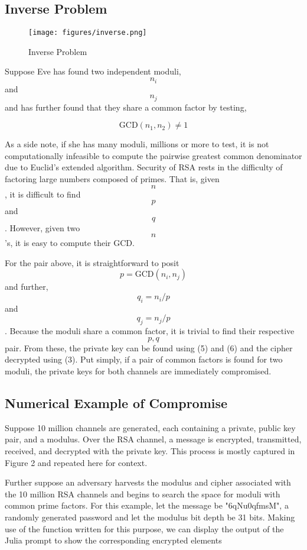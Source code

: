 \documentclass[conference]{/Users/paul/MSEE/ee595/project/report/IEEEtran/IEEEtran}
\begin{document}
\subsection{Inverse Problem}
 
\begin{figure}[h]
    \texttt{[image: figures/inverse.png]}%
    \caption{Inverse Problem}
\end{figure}
 
Suppose Eve has found two independent moduli, $$n_i$$ and $$n_j$$ and has further found that they share a common factor by testing, 
 
\begin{equation}
    \text{GCD}(n_1, n_2) \neq 1
\end{equation}
 
As a side note, if she has many moduli, millions or more to test, it is not computationally infeasible to compute the pairwise greatest common denominator due to Euclid's extended algorithm. Security of RSA rests in the difficulty of factoring large numbers composed of primes. That is, given $$n$$, it is difficult to find $$p$$ and $$q$$. However, given two $$n$$'s, it is easy to compute their GCD. 

For the pair above, it is straightforward to posit $$p = \text{GCD}(n_i, n_j)$$ and further, $$q_i = n_i/p$$ and $$q_j = n_j/p$$. Because the moduli share a common factor, it is trivial to find their respective $$p, q$$ pair. From these, the private key can be found using (5) and (6) and the cipher decrypted using (3). Put simply, if a pair of common factors is found for two moduli, the private keys for both channels are immediately compromised. 
 
 
\subsection{Numerical Example of Compromise}
 
Suppose 10 million channels are generated, each containing a private, public key pair, and a modulus. Over the RSA channel, a message is encrypted, transmitted, received, and decrypted with the private key. This process is mostly captured in Figure 2 and repeated here for context.

Further suppose an adversary harvests the modulus and cipher associated with the 10 million RSA channels and begins to search the space for moduli with common prime factors. For this example, let the message be "6qNu0qfmsM", a randomly generated password and let the modulus bit depth be 31 bits. Making use of the function written for this purpose, we can display the output of the Julia prompt to show the corresponding encrypted elements 
 
\end{document}
